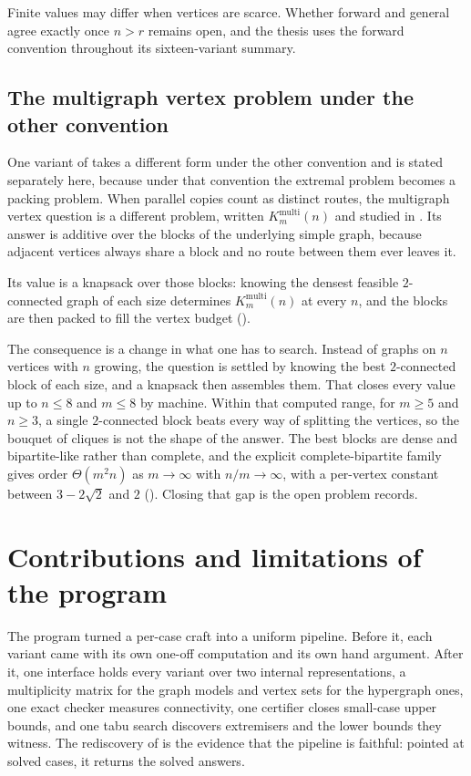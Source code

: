 Finite values may differ when vertices are scarce. Whether forward and general
agree exactly once $n>r$ remains open, and the thesis uses the forward convention
throughout its sixteen-variant summary.

\subsection{The multigraph vertex problem under the other convention}
\label{sec:multi-vertex-summary}

One variant of  takes a different form under the other convention and is stated separately here, because under that convention the extremal problem becomes a packing problem. When parallel copies count as distinct routes, the multigraph vertex question is a different problem, written $K_m^{\mathrm{multi}}(n)$ and studied in . Its answer is additive over the blocks of the underlying simple graph, because adjacent vertices always share a block and no route between them ever leaves it.

Its value is a knapsack over those blocks: knowing the densest feasible $2$-connected graph of each size determines $K_m^{\mathrm{multi}}(n)$ at every $n$, and the blocks are then packed to fill the vertex budget ().

The consequence is a change in what one has to search. Instead of graphs on $n$ vertices with $n$ growing, the question is settled by knowing the best $2$-connected block of each size, and a knapsack then assembles them. That closes every value up to $n \le 8$ and $m \le 8$ by machine. Within that computed range, for $m \ge 5$ and $n\ge3$, a single $2$-connected block beats every way of splitting the vertices, so the bouquet of cliques is not the shape of the answer. The best blocks are dense and bipartite-like rather than complete, and the explicit complete-bipartite family gives order $\Theta(m^2 n)$ as $m\to\infty$ with $n/m\to\infty$, with a per-vertex constant between $3-2\sqrt2$ and $2$ (). Closing that gap is the open problem  records.

\section{Contributions and limitations of the program}

The program turned a per-case craft into a uniform pipeline. Before it, each variant came with its own one-off computation and its own hand argument. After it, one interface holds every variant over two internal representations, a multiplicity matrix for the graph models and vertex sets for the hypergraph ones, one exact checker measures connectivity, one certifier closes small-case upper bounds, and one tabu search discovers extremisers and the lower bounds they witness. The rediscovery of  is the evidence that the pipeline is faithful: pointed at solved cases, it returns the solved answers.

